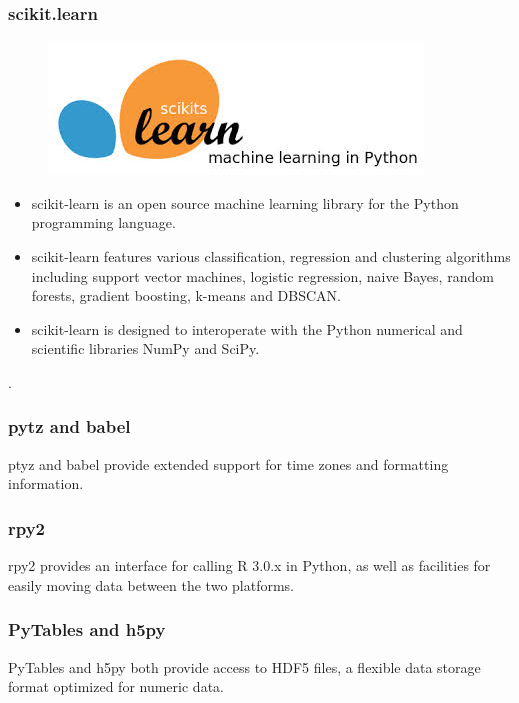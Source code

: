 \documentclass[MASTER.tex]{subfiles}
\begin{document}
\begin{frame}
	\frametitle{scikit.learn}
		\begin{figure}
			\centering
			\includegraphics[width=0.5\linewidth]{SKL-logo2}
		
		\end{figure}
		
	\begin{itemize}
	\item scikit-learn is an open source machine learning library for the Python programming language. 
	\item scikit-learn features various classification, regression and clustering algorithms including support vector machines, logistic regression, naive Bayes, random forests, gradient boosting, k-means and DBSCAN. \item scikit-learn is designed to interoperate with the Python numerical and scientific libraries NumPy and SciPy.
	\end{itemize}
	.
\end{frame}
\begin{frame}
	\frametitle{pytz and babel}
ptyz and babel provide extended support for time zones and formatting information.
\end{frame}
\begin{frame}
	\frametitle{rpy2 }
rpy2 provides an interface for calling R 3.0.x in Python, as well as facilities for easily moving data between
the two platforms.
\end{frame}
\begin{frame}
	\frametitle{ PyTables and h5py }
PyTables and h5py both provide access to HDF5 files, a flexible data storage format optimized for numeric
data.
\end{frame}
\end{document}
